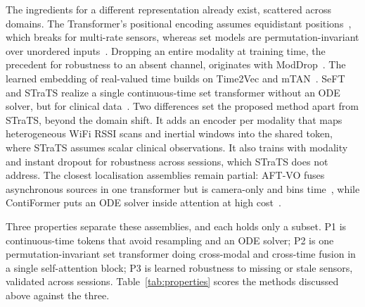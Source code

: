 The ingredients for a different representation already exist, scattered across
domains. The Transformer's positional encoding assumes equidistant
positions~\cite{vaswani2017transformer}, which breaks for multi-rate sensors,
whereas set models are permutation-invariant over unordered
inputs~\cite{lee2019settransformer}. Dropping an entire modality at training time,
the precedent for robustness to an absent channel, originates with
ModDrop~\cite{neverova2014moddrop}. The learned embedding of real-valued time
builds on Time2Vec and mTAN~\cite{kazemi2019time2vec,shukla2021mtan}. SeFT and
STraTS realize a single continuous-time set transformer without an ODE solver, but
for clinical data~\cite{horn2020seft,tipirneni2022strats}. Two differences set the
proposed method apart from STraTS, beyond the domain shift. It adds an encoder per
modality that maps heterogeneous WiFi RSSI scans and inertial windows into the
shared token, where STraTS assumes scalar clinical observations. It also trains
with modality and instant dropout for robustness across sessions, which STraTS
does not address. The closest localisation
assemblies remain partial: AFT-VO fuses asynchronous sources in one transformer
but is camera-only and bins time~\cite{kaygusuz2022aftvo}, while ContiFormer puts
an ODE solver inside attention at high cost~\cite{chen2023contiformer}.

Three properties separate these assemblies, and each holds only a subset.
P1 is continuous-time tokens that avoid resampling and an ODE solver; P2 is one
permutation-invariant set transformer doing cross-modal and cross-time fusion in
a single self-attention block; P3 is learned robustness to missing or stale
sensors, validated across sessions. Table~\ref{tab:properties} scores the methods
discussed above against the three.

